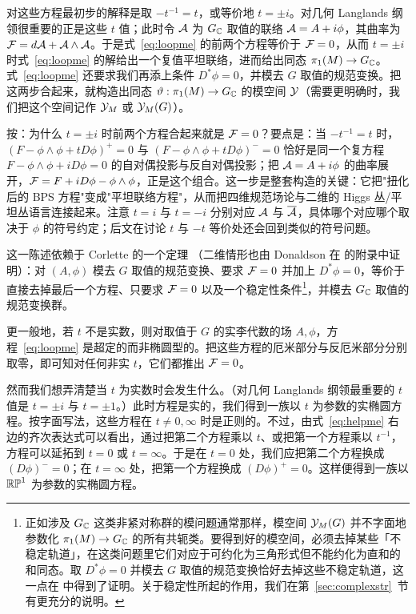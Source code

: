 对这些方程最初步的解释是取 $-t^{-1}=t$，或等价地 $t=\pm i$。对几何 Langlands 纲领很重要的正是这些 $t$ 值；此时令 ${\cal A}$ 为 ${G}_{\Bbb{C}}$ 取值的联络 ${\cal A}=A+i\phi$，其曲率为 ${\cal F}=d{\cal A}+{\cal A}\wedge{\cal A}$。于是式~\eqref{eq:loopme} 的前两个方程等价于 ${\cal F}=0$，从而 $t=\pm i$ 时式~\eqref{eq:loopme} 的解给出一个复值平坦联络，进而给出同态 $\pi_1(M)\to G_{{\Bbb{C}}}$。式~\eqref{eq:loopme} 还要求我们再添上条件 $D^*\phi=0$，并模去 $G$ 取值的规范变换。把这两步合起来，就构造出同态 $\vartheta:\pi_1(M)\to {{{G}}}_{\Bbb{C}}$ 的模空间 ${\cal Y}$（需要更明确时，我们把这个空间记作 ${\cal Y}_M$ 或 ${\cal Y}_M(G)$）。

\begin{yizhu}[含糊点拨]
按：为什么 $t=\pm i$ 时前两个方程合起来就是 ${\cal F}=0$？要点是：当 $-t^{-1}=t$ 时，$(F-\phi\wedge\phi+tD\phi)^+=0$ 与 $(F-\phi\wedge\phi+tD\phi)^-=0$ 恰好是同一个复方程 $F-\phi\wedge\phi+iD\phi=0$ 的自对偶投影与反自对偶投影；把 ${\cal A}=A+i\phi$ 的曲率展开，${\cal F}=F+iD\phi-\phi\wedge\phi$，正是这个组合。这一步是整套构造的关键：它把"扭化后的 BPS 方程"变成"平坦联络方程"，从而把四维规范场论与二维的 Higgs 丛/平坦丛语言连接起来。注意 $t=i$ 与 $t=-i$ 分别对应 ${\cal A}$ 与 $\bar{\cal A}$，具体哪个对应哪个取决于 $\phi$ 的符号约定；后文在讨论 $t$ 与 $-t$ 等价处还会回到类似的符号问题。
\end{yizhu}
这一陈述依赖于 Corlette 的一个定理 \cite{ref58}（二维情形也由 Donaldson 在 \cite{ref20} 的附录中证明）：对 $(A,\phi)$ 模去 $G$ 取值的规范变换、要求 ${\cal F}=0$ 并加上 $D^*\phi=0$，等价于直接去掉最后一个方程、只要求 ${\cal F}=0$ 以及一个稳定性条件\footnote{正如涉及 $G_{\Bbb{C}}$ 这类非紧对称群的模问题通常那样，模空间 ${\cal Y}_M(G)$ 并不字面地参数化 $\pi_1(M)\to G_{\Bbb{C}}$ 的所有共轭类。要得到好的模空间，必须去掉某些「不稳定轨道」，在这类问题里它们对应于可约化为三角形式但不能约化为直和的和同态。取 $D^*\phi=0$ 并模去 $G$ 取值的规范变换恰好去掉这些不稳定轨道，这一点在 \cite{ref58} 中得到了证明。关于稳定性所起的作用，我们在第~\ref{sec:complexstr}~节有更充分的说明。}，并模去 $G_{\Bbb{C}}$ 取值的规范变换群。

更一般地，若 $t$ 不是实数，则对取值于 $G$ 的实李代数的场 $A,\phi$，方程~\eqref{eq:loopme} 是超定的而非椭圆型的。把这些方程的厄米部分与反厄米部分分别取零，即可知对任何非实 $t$，它们都推出 ${\cal F}=0$。

然而我们想弄清楚当 $t$ 为实数时会发生什么。（对几何 Langlands 纲领最重要的 $t$ 值是 $t=\pm i$ 与 $t=\pm 1$。）此时方程是实的，我们得到一族以 $t$ 为参数的实椭圆方程。按字面写法，这些方程在 $t\not=0,\infty$ 时是正则的。不过，由式~\eqref{eq:helpme} 右边的齐次表达式可以看出，通过把第二个方程乘以 $t$、或把第一个方程乘以 $t^{-1}$，方程可以延拓到 $t=0$ 或 $t=\infty$。于是在 $t=0$ 处，我们应把第二个方程换成 $(D\phi)^-=0$；在 $t=\infty$ 处，把第一个方程换成 $(D\phi)^+=0$。这样便得到一族以 $\Bbb{RP}^1$ 为参数的实椭圆方程。

